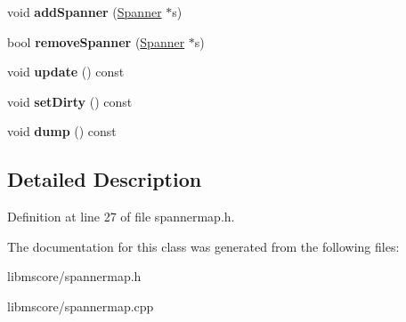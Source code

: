 \begin{DoxyCompactItemize}
\item 
\mbox{\label{class_ms_1_1_spanner_map_a928ca3fcea1ea9f7e2a525b8e03708a6}} 
void {\bfseries add\+Spanner} (\hyperlink{class_ms_1_1_spanner}{Spanner} $\ast$s)
\item 
\mbox{\label{class_ms_1_1_spanner_map_a19821abac580506748d78b3e571aa08f}} 
bool {\bfseries remove\+Spanner} (\hyperlink{class_ms_1_1_spanner}{Spanner} $\ast$s)
\item 
\mbox{\label{class_ms_1_1_spanner_map_ab7d84ad171a45865bf1190e2350a98f2}} 
void {\bfseries update} () const
\item 
\mbox{\label{class_ms_1_1_spanner_map_a4fd6e5a0b39024b986ed9836814f053b}} 
void {\bfseries set\+Dirty} () const
\item 
\mbox{\label{class_ms_1_1_spanner_map_aa83a9d6a14fcbc080c5a350a5556d02a}} 
void {\bfseries dump} () const
\end{DoxyCompactItemize}


\subsection{Detailed Description}


Definition at line 27 of file spannermap.\+h.



The documentation for this class was generated from the following files\+:\begin{DoxyCompactItemize}
\item 
libmscore/spannermap.\+h\item 
libmscore/spannermap.\+cpp\end{DoxyCompactItemize}
